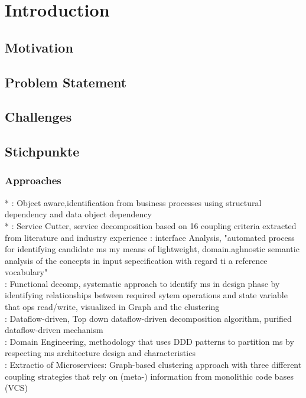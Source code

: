 
\chapter{Introduction}
\label{ch:Introduction}



\section{Motivation}
\label{sec:Introduction:Motivation}

\section{Problem Statement}
\label{sec:Introduction:ProblemStatement}

\section{Challenges}
\label{sec:Introduction:Challenges}



\section{Stichpunkte}

\subsection{Approaches}
* \cite{ObjectAwareAmiri}: Object aware,identification from business processes using structural dependency and data object dependency\\
* \cite{ServiceCutter}: Service Cutter, service decomposition based on 16 coupling criteria extracted from literature and industry experience
\cite{interfaceAnalysisBaresi}: interface Analysis,  "automated process for identifying candidate ms my means of lightweight, domain.aghnostic semantic analysis of the concepts in input sepecification with regard ti a reference vocabulary" \\
\cite{FunctionalDecompositionHeinrich} : Functional decomp, systematic approach to identify ms in design phase by identifying relationships between required sytem operations and state variable that ops read/write, visualized in Graph and the clustering\\
\cite{DataflowDrivenChen}: Dataflow-driven, Top down dataflow-driven decomposition algorithm, purified dataflow-driven mechanism \\
\cite{DomainEngineeringMunezero}: Domain Engineering, methodology that uses DDD patterns to partition ms by respecting ms architecture design and characteristics \\
\cite{ExtractionMazlami}: Extractio of Microservices: Graph-based clustering approach with three different coupling strategies that rely on (meta-) information from monolithic code bases (VCS)




